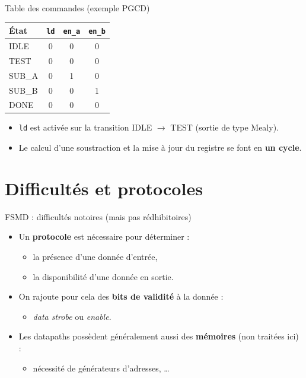 \begin{frame}{Table des commandes (exemple PGCD)}
  \centering
  \begin{tabular}{lccc}
    \toprule
    \'Etat & \texttt{ld} & \texttt{en\_a} & \texttt{en\_b} \\
    \midrule
    IDLE  & 0 & 0 & 0 \\
    TEST  & 0 & 0 & 0 \\
    SUB\_A & 0 & 1 & 0 \\
    SUB\_B & 0 & 0 & 1 \\
    DONE  & 0 & 0 & 0 \\
    \bottomrule
  \end{tabular}

  \vspace{3mm}
  \begin{itemize}
    \item \texttt{ld} est activ\'ee sur la transition IDLE $\to$ TEST (sortie de type Mealy).
    \item Le calcul d'une soustraction et la mise \`a jour du registre se font en \textbf{un cycle}.
  \end{itemize}
\end{frame}

\section{Difficult\'es et protocoles}

\begin{frame}{FSMD : difficult\'es notoires (mais pas r\'edhibitoires)}
  \begin{itemize}
    \item Un \textbf{protocole} est n\'ecessaire pour d\'eterminer :
    \begin{itemize}
      \item la pr\'esence d'une donn\'ee d'entr\'ee,
      \item la disponibilit\'e d'une donn\'ee en sortie.
    \end{itemize}
    \item On rajoute pour cela des \textbf{bits de validit\'e} \`a la donn\'ee :
    \begin{itemize}
      \item \emph{data strobe} ou \emph{enable}.
    \end{itemize}
    \item Les datapaths poss\`edent g\'en\'eralement aussi des \textbf{m\'emoires} (non trait\'ees ici) :
    \begin{itemize}
      \item n\'ecessit\'e de g\'en\'erateurs d'adresses, \dots
    \end{itemize}
  \end{itemize}
\end{frame}

